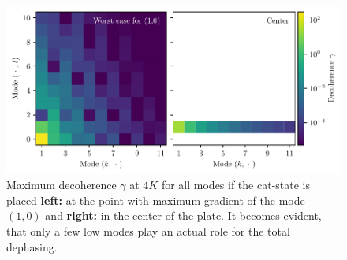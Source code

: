 \begin{figure}[!htbp]
  \centering
  \includegraphics[width=\textwidth]{./../figures/vibrations/decoherence-analytical.pdf}
  \caption{Maximum decoherence $\gamma$ at $4\si{K}$ for all modes if the cat-state is placed \textbf{left:} at the point with maximum gradient of the mode $(1,0)$ and \textbf{right:} in the center of the plate. It becomes evident, that only a few low modes play an actual role for the total dephasing.}
  \label{fig:4:}
\end{figure}